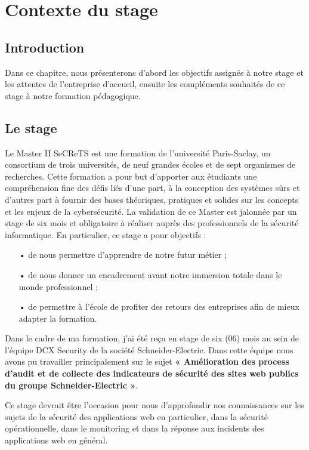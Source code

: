 \documentclass[a4paper,12pt]{book}
\theoremstyle{break}
\begin{document}
\chapter{Contexte du stage}
\section*{Introduction}
Dans ce chapitre, nous présenterons d'abord les objectifs assignés à notre stage et les attentes de l'entreprise d'accueil, ensuite les compléments souhaités de ce stage à notre formation pédagogique.

\section{Le stage}
Le Master II SeCReTS est une formation de l’université Paris-Saclay, un consortium de trois universités, de neuf grandes écoles et de sept organismes de recherches. \newline
Cette formation a pour but d’apporter aux étudiants une compréhension fine des défis liés d’une part, à la conception des systèmes sûrs et d’autres part à fournir des bases théoriques, pratiques et solides sur les concepts et les enjeux de la cybersécurité. \newline
La validation de ce Master est jalonnée par un stage de six mois et obligatoire à réaliser auprès des professionnels de la sécurité informatique. 
En particulier, ce stage a pour objectifs : 
\begin{itemize}
    \item[•]	de nous permettre d’apprendre de notre futur métier ;
    \item [•]	de nous donner un encadrement avant notre immersion totale dans le monde professionnel ;
    \item [•]	de permettre à l'école de profiter des retours des entreprises afin de mieux adapter la formation. 
\end{itemize}


Dans le cadre de ma formation, j’ai été reçu en stage de six (06) mois au sein de l’équipe DCX Security de la société Schneider-Electric. Dans cette équipe nous avons pu travailler principalement sur le sujet \textbf{« Amélioration des process d'audit et de collecte des indicateurs de sécurité des sites web publics du groupe Schneider-Electric »}. 

Ce stage devrait être l’occasion pour nous d’approfondir nos connaissances sur les sujets de la sécurité des applications web en particulier, dans la sécurité opérationnelle, dans le monitoring et dans la réponse aux incidents des applications web en général. 
\end{document}
